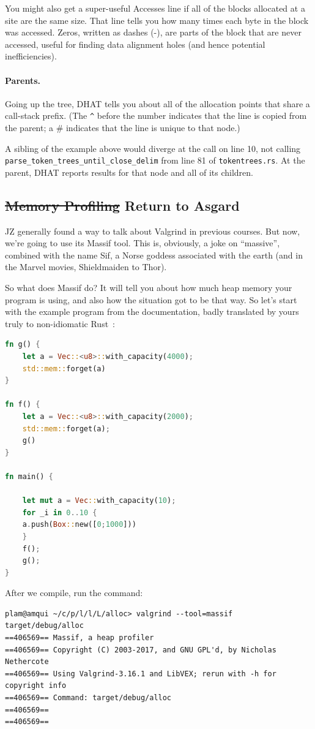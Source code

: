 You might also get a super-useful Accesses line if all of the blocks allocated at a site are the same size.
That line tells you how many times each byte in the block was accessed. Zeros, written as dashes (-), are
parts of the block that are never accessed, useful for finding data alignment holes (and hence potential
inefficiencies).

\paragraph{Parents.} Going up the tree, DHAT tells you about all of the allocation points that share a call-stack
prefix. (The \verb+^+ before the number indicates that the line is copied from the parent; a \# indicates that the line is unique to
that node.)

A sibling of the example above would diverge at the call on line 10, not calling
\texttt{parse\_token\_trees\_until\_close\_delim} from line 81 of \texttt{tokentrees.rs}. At the parent, DHAT
reports results for that node and all of its children.

\subsection*{\st{Memory Profiling} Return to Asgard}
JZ generally found a way to talk about Valgrind in previous courses. But now, we're going to use its Massif tool. This is, obviously, a joke on ``massive'', combined with the name Sif, a Norse goddess associated with the earth (and in the Marvel movies, Shieldmaiden to Thor).

So what does Massif do? It will tell you about how much heap memory your program is using, and also how the situation got to be that way. So let's start with the example program from the documentation, badly translated by yours truly to non-idiomatic Rust~\cite{massif}:


\begin{lstlisting}[language=Rust]
fn g() {
    let a = Vec::<u8>::with_capacity(4000);
    std::mem::forget(a)
}

fn f() {
    let a = Vec::<u8>::with_capacity(2000);
    std::mem::forget(a);
    g()
}

fn main() {

    let mut a = Vec::with_capacity(10);
    for _i in 0..10 {
	a.push(Box::new([0;1000]))
    }
    f();
    g();
}
\end{lstlisting}


After we compile, run the command:
{\scriptsize
\begin{verbatim}
plam@amqui ~/c/p/l/l/L/alloc> valgrind --tool=massif target/debug/alloc
==406569== Massif, a heap profiler
==406569== Copyright (C) 2003-2017, and GNU GPL'd, by Nicholas Nethercote
==406569== Using Valgrind-3.16.1 and LibVEX; rerun with -h for copyright info
==406569== Command: target/debug/alloc
==406569== 
==406569== 
\end{verbatim}
}

